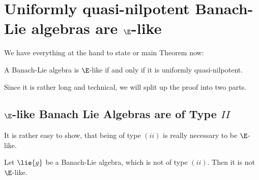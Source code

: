 \documentclass[
11pt,                          %
english                        %
]{article}
\begin{document}
\section{Uniformly quasi-nilpotent Banach-Lie algebras are $\E$-like}

We have everything at the hand to state or main Theorem now:
\begin{theorem}
	\label{Thm:Main}
	A Banach-Lie algebra is $\E$-like if and only if it is uniformly 
	quasi-nilpotent.
\end{theorem}
Since it is rather long and technical, we will split up the proof into two parts.


\subsection{$\E$-like Banach Lie Algebras are of Type $II$}
It is rather easy to show, that being of type $(ii)$ is really necessary to be 
$\E$-like.
\begin{proposition}
	Let $\lie{g}$ be a Banach-Lie algebra, which is not of type $(ii)$. Then it is 
	not $\E$-like.
\end{proposition}
\end{document}
